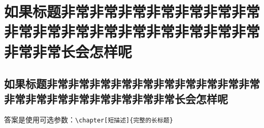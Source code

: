 \documentclass[degree=mf]{njuthesis}
\begin{document}
\maketitle 




\tableofcontents
\listoffigures
\listoftables

\mainmatter


\chapter[非常长的标题不好看]{如果标题非常非常非常非常非常非常非常非常非常非常非常非常非常非常非常非常非常非常长会怎样呢}
\section[还是用短点的吧]{如果标题非常非常非常非常非常非常非常非常非常非常非常非常非常非常非常非常非常非常长会怎样呢}
答案是使用可选参数：\verb+\chapter[短描述]{完整的长标题}+

\zhlipsum[1-20][name=zhufu]






\printbibliography[
    heading=bibintoc,
    title=参考文献]



\appendix



\end{document}

